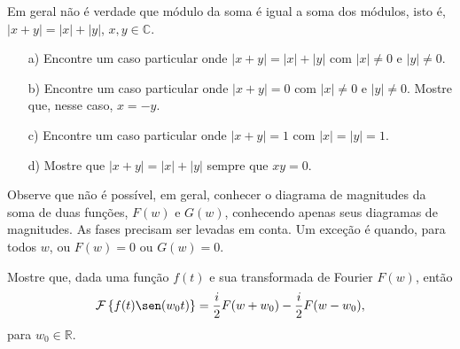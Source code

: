 \begin{exer} Em geral não é verdade que módulo da soma é igual a soma dos módulos, isto é, $|x+y|=|x|+|y|$, $x,y\in\mathbb{C}$.
\begin{itemize}
\item[a)] Encontre um caso particular onde $|x+y|=|x|+|y|$ com $|x|\neq 0$ e $|y|\neq 0$.
\item[b)] Encontre um caso particular onde $|x+y|=0$ com $|x|\neq 0$ e $|y|\neq 0$. Mostre que, nesse caso, $x=-y$.
\item[c)] Encontre um caso particular onde $|x+y|=1$ com $|x|=|y|=1$.
\item[d)] Mostre que $|x+y|=|x|+|y|$ sempre que $xy=0$.
\end{itemize}
Observe que não é possível, em geral, conhecer o diagrama de magnitudes da soma de duas funções, $F(w)$ e $G(w)$, conhecendo apenas seus diagramas de magnitudes. As fases precisam ser levadas em conta. Um exceção é quando, para todos $w$, ou $F(w)=0$ ou $G(w)=0$.
\end{exer}
\begin{exer}{\label{ex_mod_sin}}Mostre que, dada uma função $f(t)$ e sua transformada de Fourier $F(w)$, então
\begin{equation}
\mathcal{F}\left\{f(t)\sen(w_0t) \right\}=\frac{i}{2}F(w+w_0)-\frac{i}{2 }F(w-w_0),
\end{equation}
para $w_0\in\mathbb{R}$.
\end{exer}
